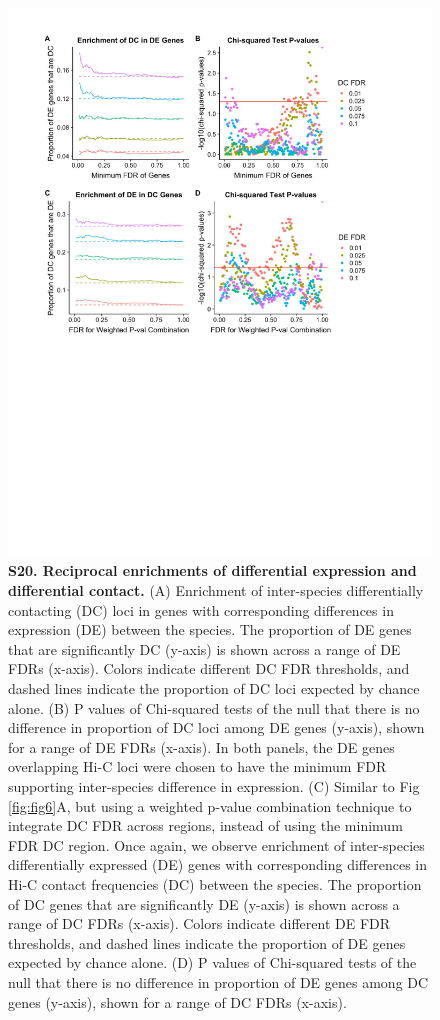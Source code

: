 \begin{figure}[!htb]
\centering
\includegraphics[width=5in]{img/figS20.pdf}
\caption[Reciprocal enrichments of differential expression and differential contact.]{\textbf{S20. Reciprocal enrichments of differential expression and differential contact.} (A) Enrichment of inter-species differentially contacting (DC) loci in genes with corresponding differences in expression (DE) between the species. The proportion of DE genes that are significantly DC (y-axis) is shown across a range of DE FDRs (x-axis). Colors indicate different DC FDR thresholds, and dashed lines indicate the proportion of DC loci expected by chance alone. (B) P values of Chi-squared tests of the null that there is no difference in proportion of DC loci among DE genes (y-axis), shown for a range of DE FDRs (x-axis). In both panels, the DE genes overlapping Hi-C loci were chosen to have the minimum FDR supporting inter-species difference in expression. (C) Similar to Fig \ref{fig:fig6}A, but using a weighted p-value combination technique \cite{Whitlock.2005} to integrate DC FDR across regions, instead of using the minimum FDR DC region. Once again, we observe enrichment of inter-species differentially expressed (DE) genes with corresponding differences in Hi-C contact frequencies (DC) between the species. The proportion of DC genes that are significantly DE (y-axis) is shown across a range of DC FDRs (x-axis). Colors indicate different DE FDR thresholds, and dashed lines indicate the proportion of DE genes expected by chance alone. (D) P values of Chi-squared tests of the null that there is no difference in proportion of DE genes among DC genes (y-axis), shown for a range of DC FDRs (x-axis).}
\label{fig:figS20}
\end{figure}

